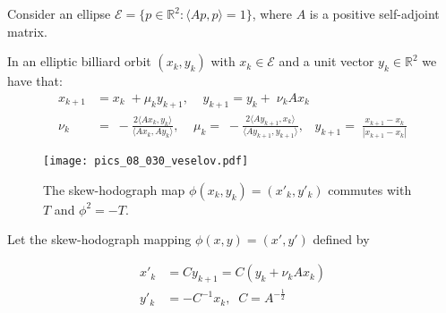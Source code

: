 Consider an ellipse $\mathcal{E}=\{p\in \mathbb{R}^2:  \langle Ap,p\rangle=1\}$, where  $A$ is a positive  self-adjoint matrix.

In an elliptic billiard orbit $ (x_k,y_k)$ with $x_k\in\mathcal{E}$ and a unit vector $y_k\in \mathbb{R}^2$ we have that:
\begin{align*}
	x_{k+1} &=x_k\;+\mu_k y_{k+1},\;\;\;\;
	y_{k+1} =y_k+\; \nu_k Ax_{k}\\
	\nu_k &=\;-\frac{2\langle Ax_k,y_k\rangle}{\langle Ax_{k},Ay_{k}\rangle},\;\;\;\;
	\mu_k  =\;-\frac{2\langle Ay_{k+1},x_k\rangle}{\langle Ay_{k+1},y_{k+1}\rangle},\;\;\;
	y_{k+1}  =\;\frac{x_{k+1}-x_k}{|x_{k+1}-x_k|}
\end{align*}
\begin{figure}[H]
\begin{center}
\texttt{[image: pics\_08\_030\_veselov.pdf]}
\caption{The skew-hodograph map $\phi(x_k,y_k)=(x'_k,y'_k)$ commutes with $T$ and $\phi^2=-T$.}
\end{center}
\end{figure}
   
 
 

Let the skew-hodograph mapping $\phi(x,y)=(x',y')$ defined by

\begin{align}
    x'_k&=Cy_{k+1}=C(y_k+\nu_k Ax_k)\nonumber \\
    y'_k&=-C^{-1}x_k, \;\; C=A^{-\frac{1}{2}}
    \label{eq:hodrog}
\end{align}

